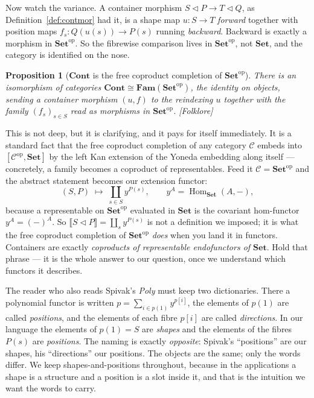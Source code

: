 \documentclass[11pt,a4paper]{book}
\newcommand{\Set}{\mathbf{Set}}
\newcommand{\Cont}{\mathbf{Cont}}
\newcommand{\Fam}{\mathbf{Fam}}
\newcommand{\y}{y}
\newcommand{\op}{^{\mathrm{op}}}
\newcommand{\cont}[2]{#1 \triangleleft #2}
\newcommand{\Ext}[1]{\llbracket #1 \rrbracket}
\DeclareMathOperator{\Hom}{Hom}
\theoremstyle{plain}
\newtheorem{Proposition}[Theorem]{Proposition}
\theoremstyle{definition}
\theoremstyle{remark}
\newcommand{\prov}[1]{\hfill\textsf{\footnotesize[#1]}}
\begin{document}
Now watch the variance. A container morphism $\cont SP\to\cont TQ$, as
Definition~\ref{def:contmor} had it, is a shape map $u\colon S\to T$ \emph{forward}
together with position maps $f_s\colon Q(u(s))\to P(s)$ running \emph{backward}.
Backward is exactly a morphism in $\Set\op$. So the fibrewise comparison lives in
$\Set\op$, not $\Set$, and the category is identified on the nose.

\begin{Proposition}[$\Cont$ is the free coproduct completion of $\Set\op$]
\label{prop:fam}
There is an isomorphism of categories $\Cont\cong\Fam(\Set\op)$, the identity on
objects, sending a container morphism $(u,f)$ to the reindexing $u$ together with
the family $(f_s)_{s\in S}$ read as morphisms in $\Set\op$.
\prov{Folklore}
\end{Proposition}

This is not deep, but it is clarifying, and it pays for itself immediately. It is a
standard fact that the free coproduct completion of any category $\mathcal C$
embeds into $[\mathcal C\op,\Set]$ by the left Kan extension of the Yoneda embedding
along itself --- concretely, a family becomes a coproduct of representables. Feed it
$\mathcal C=\Set\op$ and the abstract statement becomes our extension functor:
\[
  (S,P) \;\longmapsto\; \coprod_{s\in S}\y^{P(s)}, \qquad
  \y^{A} = \Hom_{\Set}(A,-),
\]
because a representable on $\Set\op$ evaluated in $\Set$ is the covariant
hom-functor $\y^A=(-)^A$. So $\Ext{\cont SP}=\coprod_s\y^{P(s)}$ is not a definition
we imposed; it is what the free coproduct completion of $\Set\op$ \emph{does} when
you land it in functors. Containers are exactly \emph{coproducts of representable
endofunctors of $\Set$}. Hold that phrase --- it is the whole answer to our
question, once we understand which functors it describes.

\begin{teachbox}
The reader who also reads Spivak's \emph{Poly} must keep two dictionaries. There a
polynomial functor is written $p=\sum_{i\in p(1)}\y^{p[i]}$, the elements of $p(1)$
are called \emph{positions}, and the elements of each fibre $p[i]$ are called
\emph{directions}. In our language the elements of $p(1)=S$ are \emph{shapes} and
the elements of the fibres $P(s)$ are \emph{positions}. The naming is exactly
\emph{opposite}: Spivak's ``positions'' are our shapes, his ``directions'' our
positions. The objects are the same; only the words differ. We keep
shapes-and-positions throughout, because in the applications a shape is a structure
and a position is a slot inside it, and that is the intuition we want the words to
carry.
\end{teachbox}
\end{document}
